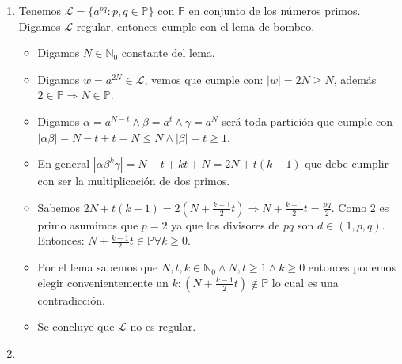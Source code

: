\documentclass[spanish, fleqn]{article}
\begin{document}
\begin{enumerate}
		\item 
			Tenemos $\mathcal{L} = \{a^{pq}: p,q \in \mathbb{P}\}$ con
			$\mathbb{P}$ en conjunto de los números primos. Digamos 
			$\mathcal{L}$ regular, entonces cumple con el lema de bombeo.
			\begin{itemize}
				\item
					Digamos $N \in \mathbb{N}_{0}$ constante del lema.
				\item
					Digamos $w = a^{2N} \in \mathcal{L}$, vemos que cumple
					con: $|w| = 2N \geq N$, además $2 \in \mathbb{P} 
					\Rightarrow N \in \mathbb{P}$.
				\item
					Digamos $\alpha = a^{N-t} \land \beta = a^{t} \land \gamma
					= a^{N}$ será toda partición que cumple	con $|\alpha\beta| 
					= N - t + t = N \leq N \land |\beta| = t \geq 1$.
				\item
					En general $|\alpha\beta^{k}\gamma| = N - t + kt + N = 2N
					+ t(k-1)$ que debe cumplir con ser la multiplicación de dos
					primos.
				\item
					Sabemos $2N + t(k-1) = 2(N + \frac{k-1}{2}t) \Rightarrow
					N + \frac{k-1}{2}t = \frac{pq}{2}$. Como $2$ es primo
					asumimos que $p=2$ ya que los divisores de $pq$ son $d \in 
					(1,p,q)$. Entonces: $N + \frac{k-1}{2}t \in 
					\mathbb{P} \forall k \geq 0$.
				\item
					Por el lema sabemos que $N,t,k \in \mathbb{N}_{0} \land N,t
					\geq 1 \land k \geq 0$ entonces podemos elegir 
					convenientemente un $k: (N + \frac{k-1}{2}t) \notin
					\mathbb{P}$ lo cual es una contradicción.
				\item
					Se concluye que $\mathcal{L}$ no es regular.
			\end{itemize}
		\item

\end{enumerate}
\end{document}
